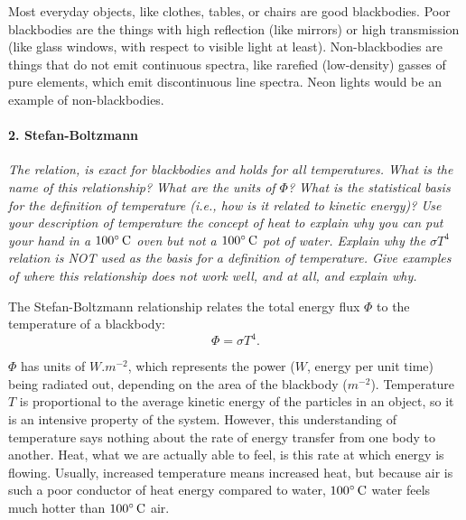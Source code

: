 \documentclass[12pt]{article}
\begin{document}
Most everyday objects, like clothes, tables, or chairs are good blackbodies. Poor blackbodies are the things with high reflection (like mirrors) or high transmission (like glass windows, with respect to visible light at least). Non-blackbodies are things that do not emit continuous spectra, like rarefied (low-density) gasses of pure elements, which emit discontinuous line spectra. Neon lights would be an example of non-blackbodies.


\paragraph{2. Stefan-Boltzmann} \emph{The relation,  is exact for blackbodies and holds for all temperatures. What is the name of this relationship? What are the units of $\Phi$? What is the statistical basis for the definition of temperature (i.e., how is it related to kinetic energy)? Use your description of temperature the concept of heat to explain why you can put your hand in a $100\degree\,\si{C}$ oven but not a $100\degree\,\si{C}$ pot of water. Explain why the $\sigma T^4$ relation is NOT used as the basis for a definition of temperature. Give examples of where this relationship does not work well, and at all, and explain why.} \medskip

The Stefan-Boltzmann relationship relates the total energy flux $\Phi$ to the temperature of a blackbody:
\begin{equation}
    \Phi = \sigma T^4.
\end{equation}

$\Phi$ has units of $\si{W.m^{-2}}$, which represents the power ($\si{W}$, energy per unit time) being radiated out, depending on the area of the blackbody ($\si{m^{-2}}$). Temperature $T$ is proportional to the average kinetic energy of the particles in an object, so it is an intensive property of the system. 
However, this understanding of temperature says nothing about the rate of energy transfer from one body to another. Heat, what we are actually able to feel, is this rate at which energy is flowing. Usually, increased temperature means increased heat, but because air is such a poor conductor of heat energy compared to water, $100\degree\,\si{C}$ water feels much hotter than $100\degree\,\si{C}$ air.
\end{document}
